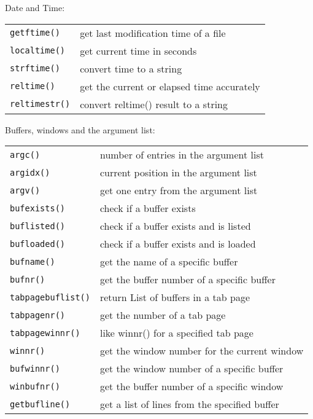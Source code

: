 Date and Time:
\label{date-functions}
\label{time-functions}
\begin{center} \begin{tabular}{l l}
				\texttt{getftime()} & get last modification time of a file \\
				\texttt{localtime()} & get current time in seconds \\
				\texttt{strftime()} & convert time to a string \\
				\texttt{reltime()} & get the current or elapsed time accurately \\
				\texttt{reltimestr()} & convert reltime() result to a string \\
\end{tabular} \end{center}

Buffers, windows and the argument list:
\label{buffer-functions}
\label{window-functions}
\label{arg-functions}
\begin{center} \begin{tabular}{l l}
				\texttt{argc()} & number of entries in the argument list \\
				\texttt{argidx()} & current position in the argument list \\
				\texttt{argv()} & get one entry from the argument list \\
				\texttt{bufexists()} & check if a buffer exists \\
				\texttt{buflisted()} & check if a buffer exists and is listed \\
				\texttt{bufloaded()} & check if a buffer exists and is loaded \\
				\texttt{bufname()} & get the name of a specific buffer \\
				\texttt{bufnr()} & get the buffer number of a specific buffer \\
				\texttt{tabpagebuflist()} & return List of buffers in a tab page \\
				\texttt{tabpagenr()} & get the number of a tab page \\
				\texttt{tabpagewinnr()} & like winnr() for a specified tab page \\
				\texttt{winnr()} & get the window number for the current window \\
				\texttt{bufwinnr()} & get the window number of a specific buffer \\
				\texttt{winbufnr()} & get the buffer number of a specific window \\
				\texttt{getbufline()} & get a list of lines from the specified buffer \\
\end{tabular} \end{center}

